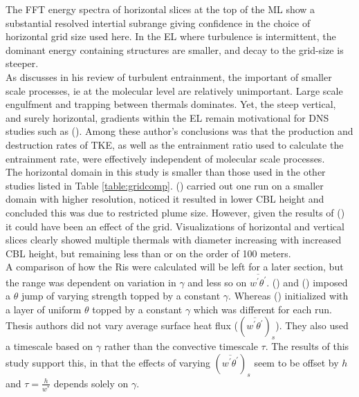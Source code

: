 The \acs{FFT} energy spectra of horizontal slices at the top of the \acs{ML} show a substantial resolved intertial subrange giving confidence in the choice of horizontal grid size used here. In the \acs{EL} where turbulence is intermittent, the dominant energy containing structures are smaller, and decay to the grid-size is steeper.\\

As \citeauthor{Turner86} discusses in his \citeyear{Turner86} review of turbulent entrainment, the important of smaller scale processes, ie at the molecular level are relatively unimportant.  Large scale engulfment and trapping between thermals dominates. Yet, the steep vertical, and surely horizontal, gradients within the \acs{EL} remain motivational for \acs{DNS} studies such as \citeauthor{GarciaMellado} (\citeyear{GarciaMellado}).  Among these author's conclusions was that the production and destruction rates of \acs{TKE}, as well as the entrainment ratio used to calculate the entrainment rate, were effectively independent of molecular scale processes.\\  

The horizontal domain in this study is smaller than those used in the other studies listed in Table \ref{table:gridcomp}. \citeauthor{SullMoengStev} (\citeyear{SullMoengStev}) carried out one run on a smaller domain with higher resolution, noticed it resulted in lower \acs{CBL} height and concluded this was due to restricted plume size. However, given the results of \citeauthor{SullPat} (\citeyear{SullPat}) it could have been an effect of the grid.  Visualizations of horizontal and vertical slices clearly showed multiple thermals with diameter increasing with increased \acs{CBL} height, but remaining less than or on the order of 100 meters.\\   

A comparison of how the \acs{Ri}s were calculated will be left for a later section, but the range was dependent on variation in $\gamma$ and less so on $\overline{w^{'}\theta^{'}}$.  \citeauthor{BrooksFowler2} (\citeyear{BrooksFowler2}) and \citeauthor{SullMoengStev} (\citeyear{SullMoengStev}) imposed a $\theta$ jump of varying strength topped by a constant $\gamma$.  Whereas \citeauthor{FedConzMir04} (\citeyear{FedConzMir04}) initialized with a layer of uniform $\theta$ topped by a constant $\gamma$ which was different for each run.  Thesis authors did not vary average surface heat flux ($(\overline{w^{'}\theta^{'}})_{s}$).  They also used a timescale based on $\gamma$ rather than the convective timescale $\tau$.  The results of this study support this, in that the effects of varying $(\overline{w^{'}\theta^{'}})_{s}$ seem to be offset by $h$ and $\tau = \frac{h}{w^{*}}$ depends solely on $\gamma$.\\    

